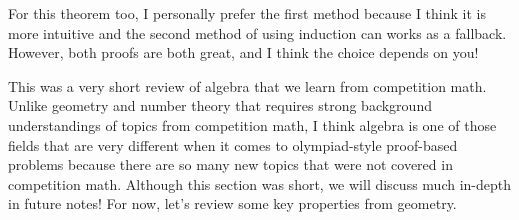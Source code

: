 \documentclass[../../../main.tex]{subfiles}
\begin{document}
For this theorem too, I personally prefer the first method because
I think it is more intuitive and the second method of using induction
can works as a fallback. However, both proofs are both great,
and I think the choice depends on you!

This was a very short review of algebra that we learn from
competition math. Unlike geometry and number theory that requires
strong background understandings of topics from competition math,
I think algebra is one of those fields that are very different
when it comes to olympiad-style proof-based problems because there
are so many new topics that were not covered in competition math.
Although this section was short, we will discuss much in-depth in
future notes! For now, let's review some key properties from geometry.
\end{document}
